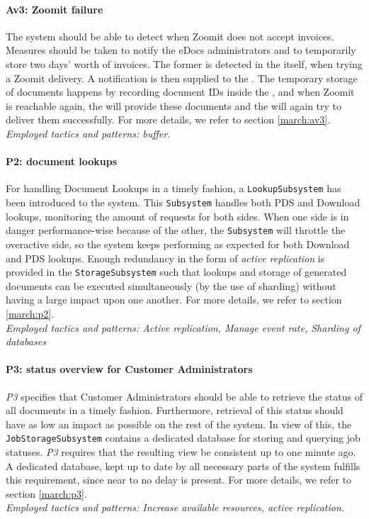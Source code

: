 \paragraph{Av3: Zoomit failure} The system should be able to detect when Zoomit does not accept invoices. Measures should be taken to notify the eDocs administrators and to temporarily store two days' worth of invoices. The former is detected in the  itself, when trying a Zoomit delivery. A notification is then supplied to the . The temporary storage of documents happens by recording document IDs inside the , and when Zoomit is reachable again, the  will provide these documents and the  will again try to deliver them successfully. For more details, we refer to section \ref{march:av3}.\\
\emph{Employed tactics and patterns: buffer.}
    
\paragraph{P2: document lookups}
For handling Document Lookups in a timely fashion, a \texttt{LookupSubsystem} has been introduced to the system. This \texttt{Subsystem} handles both PDS and Download lookups, monitoring the amount of requests for both sides. When one side is in danger performance-wise because of the other, the \texttt{Subsystem} will throttle the overactive side, so the system keeps performing as expected for both Download and PDS lookups. Enough redundancy in the form of \emph{active replication} is provided in the \texttt{StorageSubsystem} such that lookups and storage of generated documents can be executed simultaneously (by the use of sharding) without having a large impact upon one another. For more details, we refer to section \ref{march:p2}.\\
\emph{Employed tactics and patterns: Active replication, Manage event rate, Sharding of databases}
    
\paragraph{P3: status overview for Customer Administrators} \emph{P3} specifies that Customer Administrators should be able to retrieve the status of all documents in a timely fashion. Furthermore, retrieval of this status should have as low an impact as possible on the rest of the system. In view of this, the \texttt{JobStorageSubsystem} contains a dedicated database for storing and querying job statuses. \emph{P3} requires that the resulting view be consistent up to one minute ago. A dedicated database, kept up to date by all necessary parts of the system fulfills this requirement, since near to no delay is present. For more details, we refer to section \ref{march:p3}.\\
\emph{Employed tactics and patterns: Increase available resources, active replication.}
    
